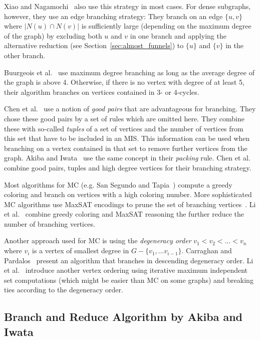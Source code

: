 \documentclass[a4paper,UKenglish,cleveref, autoref, thm-restate]{lipics-v2021}
\begin{document}
Xiao and Nagamochi~\cite{XiaoNagamochi} also use
this strategy in most cases. For dense subgraphs, however, they use an edge
branching strategy: They branch on an edge $\{u, v\}$ where $|N(u) \cap N(v)|$
is sufficiently large (depending on the maximum degree of the graph) by
excluding both $u$ and $v$ in one branch and applying the alternative reduction
(see Section~\ref{sec:almost_funnels}) to $\{u\}$ and $\{v\}$ in the other branch.

Buurgeois et al.~\cite{Bourgeois} use maximum degree branching as long as the
average degree of the graph is above 4. Otherwise, if there is no vertex with degree of at least 5, their algorithm branches on vertices
contained in 3- or 4-cycles. 

Chen et al.~\cite{ChenXiaKanj} use a notion of \emph{good pairs} that are advantageous
for branching. They chose these good pairs by a set of rules which are omitted
here. They combine these with so-called \emph{tuples} of a set of vertices and the
number of vertices from this set that have to be included in an MIS. This
information can be used when branching on a vertex
contained in that set to remove further vertices from the graph. Akiba and
Iwata~\cite{AkibaIwata} use the same concept in their \emph{packing} rule. Chen
et al. combine good pairs, tuples and high degree vertices for their branching strategy.

Most algorithms for MC (e.g. San Segundo and Tapia~\cite{Color}) compute a
greedy coloring and branch on vertices with a high coloring number.
More sophisticated MC algorithms use MaxSAT encodings to prune the set of
branching vertices~\cite{LiFangXu,LiJiang,LiQuan}. Li et al.~\cite{LiMaxSat}
combine greedy coloring and MaxSAT reasoning the further reduce the number of
branching vertices.

Another approach used for MC is using the \emph{degeneracy order} $v_1 < v_2 <
\dots < v_n$ where $v_i$ is a vertex of smallest degree in $G - \{v_1, \dots
v_{i-1}\}$. Carraghan and Pardalos~\cite{CarraghanPardalos} present an algorithm
that branches in descending degeneracy order. Li et al.~\cite{LiFangXu}
introduce another vertex ordering using iterative maximum independent set
computations (which might be easier than MC on some graphs) and breaking ties
according to the degeneracy order.

\subsection{Branch and Reduce Algorithm by Akiba and Iwata~\cite{AkibaIwata}}
\end{document}
